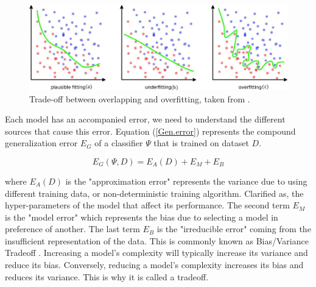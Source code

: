  
 \begin{figure}[!ht]
    \centering
    \includegraphics[width=\textwidth]{2_Background/figures/fig_overlapping.pdf}
    \caption{Trade-off between overlapping and overfitting, taken from \cite{galbusera2019}.}
    \label{ch2:overlapping}
\end{figure}


Each model has an accompanied error, we need to understand the different sources that cause this error. Equation (\ref{Gen.error}) represents the compound generalization error $E_G$ of a classifier $\Psi$ that is trained on dataset $D$. 


\begin{equation}\label{Gen.error}
E_G(\Psi,D)=E_A(D)+ E_M+E_B
\end{equation}

\noindent where $E_A(D)$ is the "approximation error" represents the variance due to using different training data, or non-deterministic training algorithm. Clarified as, the hyper-parameters of the model that affect its performance. The second term $E_M$ is the "model error" which represents the bias due to selecting a model in preference of another. The last term $E_B$ is the "irreducible error" coming from the insufficient representation of the data. This is commonly known as Bias/Variance Tradeoff \cite{geron2019,kuncheva2014}. Increasing a model’s complexity will typically increase its variance and reduce its bias.
Conversely, reducing a model’s complexity increases its bias and reduces its variance.
This is why it is called a tradeoff.    